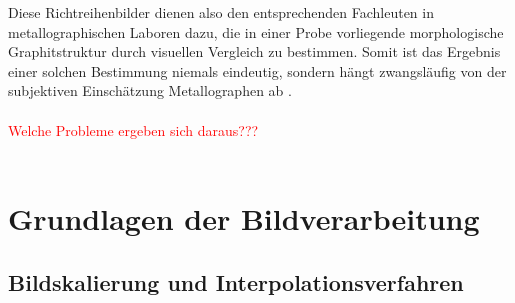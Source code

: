 \documentclass[
fontsize=10pt, 
listof = totoc,
parskip = half	
]{report}
\begin{document}
\noindent Diese Richtreihenbilder dienen also den entsprechenden Fachleuten in metallographischen Laboren dazu, die in einer Probe vorliegende morphologische Graphitstruktur durch visuellen Vergleich zu bestimmen. Somit ist das Ergebnis einer solchen Bestimmung niemals eindeutig, sondern hängt zwangsläufig von der subjektiven Einschätzung Metallographen ab \cite{ISO945}.
\\\\
\textcolor{red}{Welche Probleme ergeben sich daraus???}
\\\\


\section{Grundlagen der Bildverarbeitung}
\label{GrundlagenBildverarbeitung}


\subsection{Bildskalierung und Interpolationsverfahren}
\label{subsec:SkalierungUndInterpolation}
\end{document}
